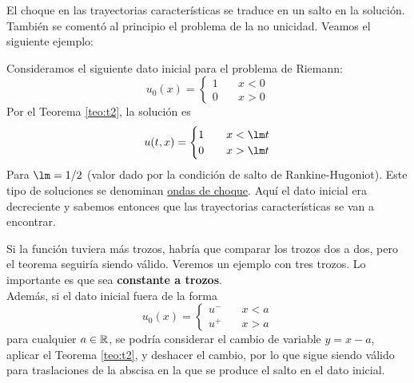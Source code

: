 \begin{observacion}
\begin{figure}[H]
\begin{center}
\begin{tikzpicture}[x=0.75pt,y=0.75pt,yscale=-1,xscale=1]
            \end{tikzpicture}
        \end{center}
    \end{figure}
\end{observacion}
El choque en las trayectorias características se traduce en un salto en la solución. \\

También se comentó al principio el problema de la no unicidad. Veamos el siguiente ejemplo:
\begin{ejemplo}
    Consideramos el siguiente dato inicial para el problema de Riemann:
    \begin{equation*}
        u_0(x) = \begin{cases}
            1 \quad& x<0 \\
            0 \quad& x>0
        \end{cases}
    \end{equation*}
    Por el Teorema \ref{teo:t2}, la solución es 
    \begin{equation*}
        u(t,x) = \begin{cases}
            1 \quad& x < \lm t \\
            0 \quad& x > \lm t
        \end{cases}
    \end{equation*}
    Para $\lm = 1/2$ (valor dado por la condición de salto de Rankine-Hugoniot). Este tipo de soluciones se denominan \underline{ondas de choque}.
    Aquí el dato inicial era decreciente y sabemos entonces que las trayectorias características se van a encontrar.
\end{ejemplo}

\begin{observacion}
    Si la función tuviera más trozos, habría que comparar los trozos dos a dos, pero el teorema seguiría siendo válido. Veremos un ejemplo con tres trozos.
    Lo importante es que sea \textbf{constante a trozos}. \\

    Además, si el dato inicial fuera de la forma 
    $$u_0(x) = \begin{cases}
        u^{-} \quad& x < a \\
        u^{+} \quad& x > a
    \end{cases}$$
    para cualquier $a \in \mathbb{R}$, se podría considerar el cambio de variable $y = x-a$, aplicar el Teorema \ref{teo:t2}, y deshacer el cambio, por 
    lo que sigue siendo válido para traslaciones de la abscisa en la que se produce el salto en el dato inicial. 
\end{observacion}

